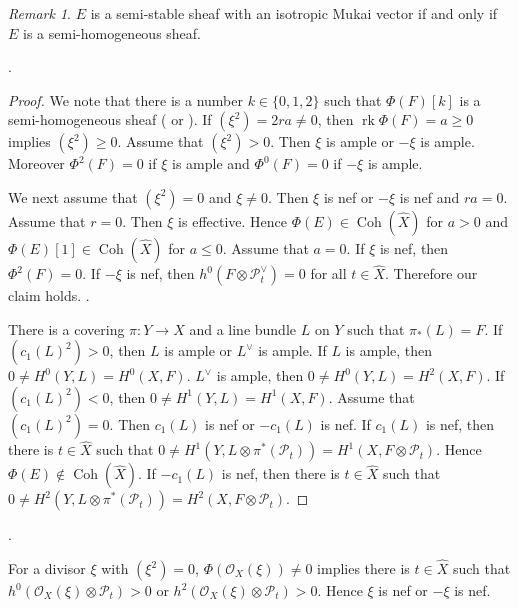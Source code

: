 \documentclass[10pt]{amsart}
\def\cal{\mathcal}
\newenvironment{NB}{
\color{red}{\bf NB}. \footnotesize 
}{}
\newenvironment{NB2}{
\color{blue}{\bf NB}. \footnotesize
}{}
\newcommand{\Coh}{\operatorname{Coh}}
\newcommand{\rk}{\operatorname{rk}}
\numberwithin{equation}{section}
\theoremstyle{plain}
\theoremstyle{definition}
\theoremstyle{remark}
\newtheorem{rem}[thm]{Remark}
\begin{document}
\begin{rem}\label{rem:semi-hom}
$E$ is a semi-stable sheaf with an isotropic Mukai vector if and only if
$E$ is a semi-homogeneous sheaf.
\end{rem}



\begin{NB}
\begin{proof}
We note that there is a number $k \in \{ 0,1,2 \}$ such that $\Phi(F)[k]$
is a semi-homogeneous sheaf (\cite[Cor. 2.10]{BM} or \cite{Or1}). 
If $(\xi^2)=2ra \ne 0$, then 
$\rk \Phi(F)=a \geq 0$ implies $(\xi^2) \geq 0$.
Assume that $(\xi^2)>0$.
Then $\xi$ is ample or $-\xi$ is ample.
Moreover $\Phi^2(F)=0$ if $\xi$ is ample and
$\Phi^0(F)=0$ if $-\xi$ is ample. 

We next assume that $(\xi^2)=0$ and $\xi \ne 0$.
Then $\xi$ is nef or $-\xi$ is nef and $ra=0$.
Assume that $r=0$. Then $\xi$ is effective.
Hence $\Phi(E) \in \Coh(\widehat{X})$ for $a>0$ and
$\Phi(E)[1] \in \Coh(\widehat{X})$ for $a \leq 0$.
Assume that $a=0$. 
If $\xi$ is nef, then $\Phi^2(F)=0$.
If $-\xi$ is nef, then $h^0(F \otimes {\cal P}_t^{\vee})=0$
for all $t \in \widehat{X}$.
Therefore our claim holds.
\begin{NB2}
There is a covering $\pi:Y \to X$ and a line bundle $L$ on $Y$
such that $\pi_*(L)=F$.
If $(c_1(L)^2) >0$, then
$L$ is ample or $L^{\vee}$ is ample.
If $L$ is ample, then $0 \ne H^0(Y,L)=H^0(X,F)$.
$L^{\vee}$ is ample, then $0 \ne H^0(Y,L)=H^2(X,F)$.
If $(c_1(L)^2)<0$, then
$0 \ne H^1(Y,L)=H^1(X,F)$.
Assume that $(c_1(L)^2)=0$.
Then $c_1(L)$ is nef or $-c_1(L)$ is nef.
If $c_1(L)$ is nef, then
there is $t \in \widehat{X}$ such that
$0 \ne H^1(Y,L \otimes \pi^*({\cal P}_t))=H^1(X,F \otimes {\cal P}_t)$.
Hence $\Phi(E) \not \in \Coh(\widehat{X})$.
If $-c_1(L)$ is nef, then
there is $t \in \widehat{X}$ such that
$0 \ne H^2(Y,L \otimes \pi^*({\cal P}_t))=H^2(X,F \otimes {\cal P}_t)$.
\end{NB2}
\end{proof}
\end{NB}



\begin{NB}
For a divisor $\xi$ with $(\xi^2)=0$,
$\Phi({\cal O}_X(\xi)) \ne 0$ implies there is $t \in \widehat{X}$ such that 
$h^0({\cal O}_X(\xi) \otimes {\cal P}_t)>0$ or
$h^2({\cal O}_X(\xi) \otimes {\cal P}_t)>0$.
Hence $\xi$ is nef or $-\xi$ is nef.
\end{NB}
\end{document}

